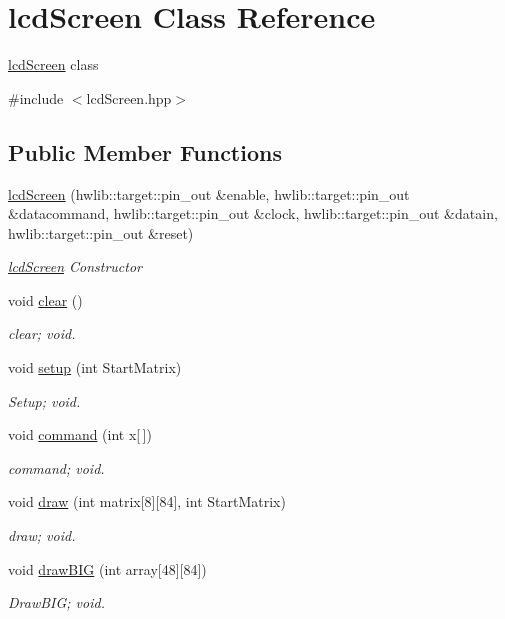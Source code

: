 \hypertarget{classlcd_screen}{}\section{lcd\+Screen Class Reference}
\label{classlcd_screen}


\hyperlink{classlcd_screen}{lcd\+Screen} class  




{\ttfamily \#include $<$lcd\+Screen.\+hpp$>$}

\subsection*{Public Member Functions}
\begin{DoxyCompactItemize}
\item 
\hyperlink{classlcd_screen_a2791f46e6caef9ffb406e8c1165f41a9}{lcd\+Screen} (hwlib\+::target\+::pin\+\_\+out \&enable, hwlib\+::target\+::pin\+\_\+out \&datacommand, hwlib\+::target\+::pin\+\_\+out \&clock, hwlib\+::target\+::pin\+\_\+out \&datain, hwlib\+::target\+::pin\+\_\+out \&reset)
\begin{DoxyCompactList}\small\item\em \hyperlink{classlcd_screen}{lcd\+Screen} Constructor \end{DoxyCompactList}\item 
void \hyperlink{classlcd_screen_a613df6d4702cd86941d3a473a846d737}{clear} ()
\begin{DoxyCompactList}\small\item\em clear; void. \end{DoxyCompactList}\item 
void \hyperlink{classlcd_screen_a37339d0d8ae50a6efcbae10d3f8c7573}{setup} (int Start\+Matrix)
\begin{DoxyCompactList}\small\item\em Setup; void. \end{DoxyCompactList}\item 
void \hyperlink{classlcd_screen_ab75ed961943609fbe7f437e9e86abe4d}{command} (int x\mbox{[}$\,$\mbox{]})
\begin{DoxyCompactList}\small\item\em command; void. \end{DoxyCompactList}\item 
void \hyperlink{classlcd_screen_a9d8cee1ed44907c5fbfc52bbe1205853}{draw} (int matrix\mbox{[}8\mbox{]}\mbox{[}84\mbox{]}, int Start\+Matrix)
\begin{DoxyCompactList}\small\item\em draw; void. \end{DoxyCompactList}\item 
void \hyperlink{classlcd_screen_af9d494e72329e3eca29209bfd2d05882}{draw\+B\+IG} (int array\mbox{[}48\mbox{]}\mbox{[}84\mbox{]})
\begin{DoxyCompactList}\small\item\em Draw\+B\+IG; void. \end{DoxyCompactList}\end{DoxyCompactItemize}


